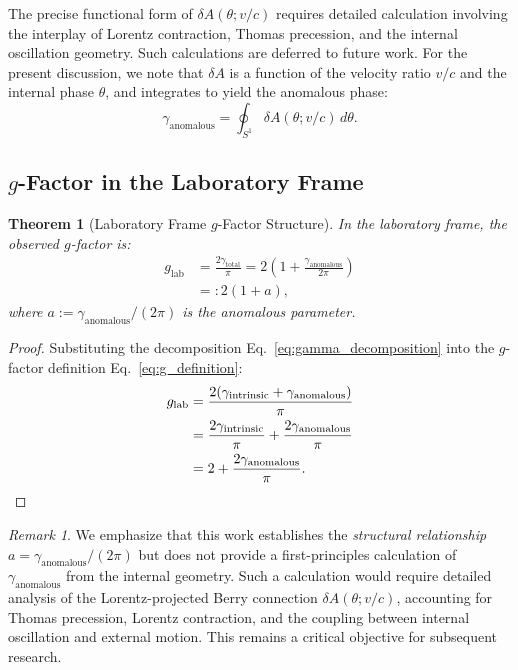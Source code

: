\documentclass[%
 reprint,
 amsmath,amssymb,
 aps,
 prb,
]{revtex4-2}
\numberwithin{equation}{section}
\newtheorem{theorem}{Theorem}[section]
\theoremstyle{definition}
\theoremstyle{remark}
\newtheorem{remark}{Remark}[section]
\newcommand{\Sone}{S^1}
\begin{document}
The precise functional form of $\delta A(\theta; v/c)$ requires detailed calculation involving the interplay of Lorentz contraction, Thomas precession, and the internal oscillation geometry. Such calculations are deferred to future work. For the present discussion, we note that $\delta A$ is a function of the velocity ratio $v/c$ and the internal phase $\theta$, and integrates to yield the anomalous phase:
\begin{equation}
\gamma_{\text{anomalous}} = \oint_{\Sone} \delta A(\theta; v/c) \, d\theta.
\label{eq:gamma_anomalous_definition}
\end{equation}

\subsection{$g$-Factor in the Laboratory Frame}

\begin{theorem}[Laboratory Frame $g$-Factor Structure]
\label{thm:g_lab}
In the laboratory frame, the observed $g$-factor is:
\begin{equation}
\begin{split}
g_{\text{lab}} &= \frac{2\gamma_{\text{total}}}{\pi} = 2 \left(1 + \frac{\gamma_{\text{anomalous}}}{2\pi}\right) \\
&=: 2(1 + a),
\end{split}
\label{eq:g_lab}
\end{equation}
where $a := \gamma_{\text{anomalous}}/(2\pi)$ is the anomalous parameter.
\end{theorem}

\begin{proof}
Substituting the decomposition Eq.~\eqref{eq:gamma_decomposition} into the $g$-factor definition Eq.~\eqref{eq:g_definition}:
\begin{align}
g_{\text{lab}} &= \frac{2(\gamma_{\text{intrinsic}} + \gamma_{\text{anomalous}})}{\pi} \nonumber \\
&= \frac{2\gamma_{\text{intrinsic}}}{\pi} + \frac{2\gamma_{\text{anomalous}}}{\pi} \nonumber \\
&= 2 + \frac{2\gamma_{\text{anomalous}}}{\pi}. \qedhere
\end{align}
\end{proof}

\begin{remark}
We emphasize that this work establishes the \emph{structural relationship} $a = \gamma_{\text{anomalous}}/(2\pi)$ but does not provide a first-principles calculation of $\gamma_{\text{anomalous}}$ from the internal geometry. Such a calculation would require detailed analysis of the Lorentz-projected Berry connection $\delta A(\theta; v/c)$, accounting for Thomas precession, Lorentz contraction, and the coupling between internal oscillation and external motion. This remains a critical objective for subsequent research.
\end{remark}
\end{document}
